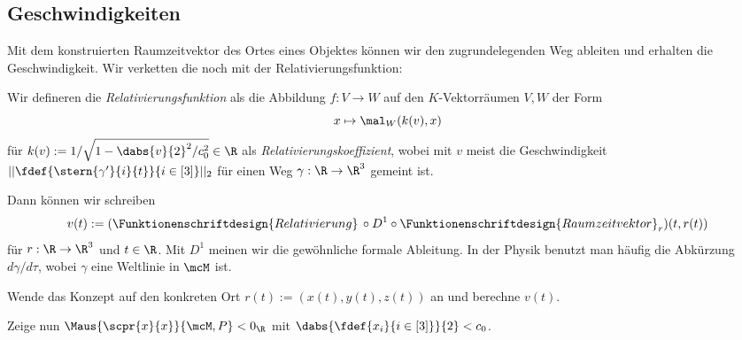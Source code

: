 \documentclass[../WiSe22ANA3.tex]{subfiles}
\begin{document}
			\subsection*{Geschwindigkeiten}
				Mit dem konstruierten Raumzeitvektor des Ortes eines Objektes können wir den zugrundelegenden Weg ableiten und erhalten die Geschwindigkeit. Wir verketten die noch mit der Relativierungsfunktion:
				\begin{info}[Relativierung]
					Wir defineren die \emph{Relativierungsfunktion} als die Abbildung $f:V\to W$ auf den $K$-Vektorräumen $V,W$ der Form 
					$$x\mapsto \mal_{W}(k(v),x)$$
					für $k(v):=1/\sqrt{1-\dabs{v}{2}^2/c_0^2}\in\R$ als \emph{Relativierungskoeffizient}, wobei mit $v$ meist die Geschwindigkeit $||\fdef{\stern{\gamma'}{i}{t}}{i\in[3]}||_2$ für einen Weg $\gamma:\R\to\R^3$ gemeint ist. 
				\end{info}
				\noindent Dann können wir schreiben 
				$$v(t):=(\Funktionenschriftdesign{Relativierung}\,\circ D^1\circ \Funktionenschriftdesign{Raumzeitvektor}_r)(t,r(t))$$
				für $r:\R\to\R^3$ und $t\in\R$. Mit $D^1$ meinen wir die gewöhnliche formale Ableitung. In der Physik benutzt man häufig die Abkürzung $d\gamma/d\tau$, wobei $\gamma$ eine Weltlinie in $\mcM$ ist. 
				\begin{Aufgabe}
					\nr Wende das Konzept auf den konkreten Ort $r(t):=(x(t),y(t),z(t))$ an und berechne $v(t)$. 
					
					\nr Zeige nun $\Maus{\scpr{x}{x}}{\mcM,P}<0_\R$ mit $\dabs{\fdef{x_i}{i\in[3]}}{2}<c_0$. 
				\end{Aufgabe}
\end{document}
